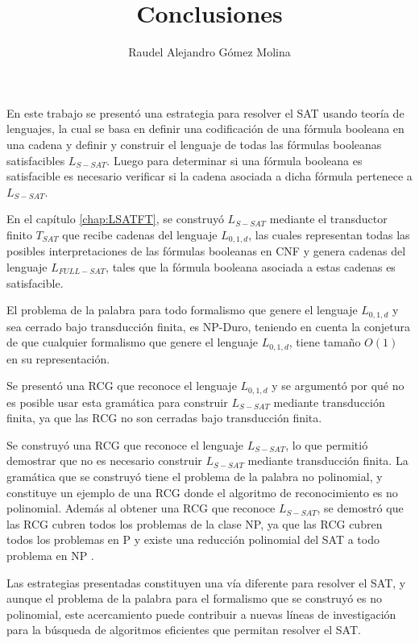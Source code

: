 \documentclass[12pt]{article}
\title{Conclusiones}
\author{Raudel Alejandro Gómez Molina}
\begin{document}
\maketitle

En este trabajo se presentó una estrategia para resolver el SAT usando teoría de lenguajes, la cual se basa en definir
una codificación de una fórmula booleana en una cadena y definir y construir el lenguaje de todas las fórmulas booleanas
satisfacibles $L_{S-SAT}$. Luego para determinar si una fórmula booleana es satisfacible es necesario verificar si la cadena asociada
a dicha fórmula pertenece a $L_{S-SAT}$.

En el capítulo \ref{chap:LSATFT}, se construyó $L_{S-SAT}$ mediante el transductor finito $T_{SAT}$ que recibe
cadenas del lenguaje $L_{0,1,d}$, las cuales representan todas las posibles interpretaciones de las fórmulas
booleanas en CNF y genera cadenas del lenguaje $L_{FULL-SAT}$, tales que la fórmula booleana asociada a estas
cadenas es satisfacible.

El problema de la palabra para todo formalismo que genere
el lenguaje $L_{0,1,d}$ y sea cerrado bajo transducción finita, es NP-Duro, teniendo en cuenta la conjetura
de que cualquier formalismo que genere el lenguaje $L_{0,1,d}$, tiene tamaño $O(1)$ en su representación.

Se presentó una RCG que reconoce el lenguaje $L_{0,1,d}$ y se argumentó por qué no es posible
usar esta gramática para construir $L_{S-SAT}$ mediante transducción finita, ya que las RCG no son cerradas bajo transducción finita.

Se construyó una RCG que reconoce el lenguaje $L_{S-SAT}$, lo que permitió demostrar
que no es necesario construir $L_{S-SAT}$ mediante transducción finita. La gramática que se construyó tiene el problema
de la palabra no polinomial, y constituye un ejemplo de una RCG donde el algoritmo de reconocimiento es no polinomial.
Además al obtener una RCG que reconoce $L_{S-SAT}$, se demostró que las RCG cubren todos los problemas de la clase NP,
ya que las RCG cubren todos los problemas en P \cite{mainRCGBib} y existe una reducción polinomial del SAT a todo problema en NP \cite{authomataTheory}.

Las estrategias presentadas constituyen una vía diferente
para resolver el SAT, y aunque el problema de la palabra para el formalismo que se construyó es no polinomial,
este acercamiento puede contribuir a nuevas líneas de investigación para la búsqueda de algoritmos eficientes que permitan
resolver el SAT.
\end{document}
